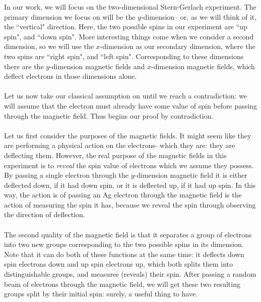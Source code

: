         In our work, we will focus on the two-dimensional Stern-Gerlach experiment. The primary dimension we focus on will be the $y$-dimension-- or, as we will think of it, the ``vertical" direction. Here, the two possible spins in our experiment are ``up spin", and ``down spin". More interesting things come when we consider a second dimension, so we will use the $x$-dimension as our secondary dimension, where the two spins are ``right spin", and ``left spin". Corresponding to these dimensions there are the $y$-dimension magnetic fields and $x$-dimension magnetic fields, which deflect electrons in those dimensions alone.
\\\\
Let us now take our classical assumption on until we reach a contradiction: we will assume that the electron must already have some value of spin before passing through the magnetic field. Thus begins our proof by contradiction.
\\\\
Let us first consider the purposes of the magnetic fields. It might seem like they are performing a physical action on the electrons- which they are: they are deflecting them. However, the real purpose of the magnetic fields in this experiment is to \textit{reveal} the spin value of electrons which we assume they possess. By passing a single electron through the $y$-dimension magnetic field it is either deflected down, if it had down spin, or it is deflected up, if it had up spin. In this way, the action is of passing an Ag electron through the magnetic field is the action of measuring the spin it has, because we reveal the spin through observing the direction of deflection. 
\\\\
The second quality of the magnetic field is that it separates a group of electrons into two new groups corresponding to the two possible spins in its dimension. Note that it can do both of these functions at the same time: it deflects down spin electrons down and up spin electrons up, which both splits them into distinguishable groups, and measures (reveals) their spin. After passing a random beam of electrons through the magnetic field, we will get these two resulting groups split by their initial spin: surely, a useful thing to have. 
\\\\
